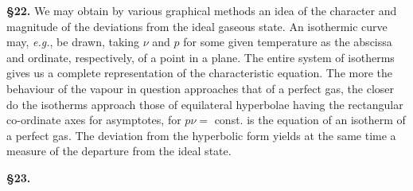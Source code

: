 \documentclass[oneside,12pt]{book}
\begin{document}
\textbf{\S 22.} We may obtain by various graphical methods an idea of the character and magnitude of the deviations from the ideal gaseous state. An isothermic curve may, \textit{e.g.}, be drawn, taking $\nu$ and $p$ for some given temperature as the abscissa and ordinate, respectively, of a point in a plane. The entire system of isotherms gives us a complete representation of the characteristic equation. The more the behaviour of the vapour in question approaches that of a perfect gas, the closer do the isotherms approach those of equilateral hyperbolae having the rectangular co-ordinate axes for asymptotes, for $p\nu=$ const. is the equation of an isotherm of a perfect gas. The deviation from the hyperbolic form yields at the same time a measure of the departure from the ideal state. \par 

\textbf{\S 23.}
\end{document}
